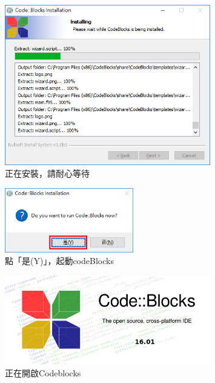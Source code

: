 		\begin{figure}[H]
			\centering
			\includegraphics[width=0.8\textwidth]{fig/install_and_setting/install_008_setup05}
			\caption{正在安裝，請耐心等待}
		\end{figure}
		
		\begin{figure}[H]
			\centering
			\includegraphics[width=0.5\textwidth]{fig/install_and_setting/install_009_setup06}
			\caption{點「是(Y)」，起動codeBlocks}
		\end{figure}
		
		\begin{figure}[H]
			\centering
			\includegraphics[width=0.8\textwidth]{fig/install_and_setting/install_010_setup07}
			\caption{正在開啟Codeblocks}
		\end{figure}
		
